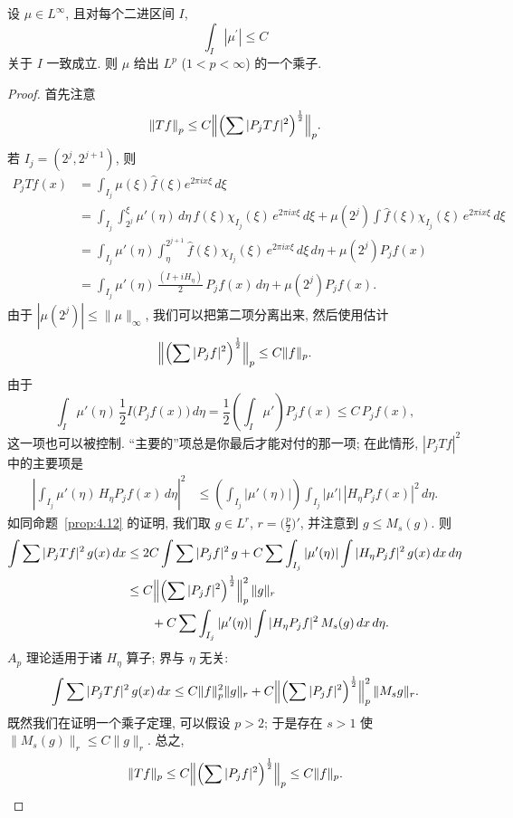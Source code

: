 \begin{theorem}\label{thm:4.14}
设 $\mu\in L^{\infty}$, 且对每个二进区间 $I$,
\[
\int_{I}|\mu^{\prime}|\leq C
\]
关于 $I$ 一致成立. 则 $\mu$ 给出 $L^{p}$ ($1<p<\infty$) 的一个乘子.
\end{theorem}

\begin{proof}
首先注意
\[
\left\|T f\right\|_{p}\leq C\Bigl\|\Bigl(\sum|P_{j}T f|^{2}\Bigr)^{\frac{1}{2}}\Bigr\|_{p}.
\]
若 $I_{j}=(2^{j},2^{j+1})$, 则
\begin{align*}
P_{j}Tf(x)&=\int_{I_{j}}\mu(\xi)\hat{f}(\xi)e^{2\pi ix\xi}\,d\xi \\
&=\int_{I_{j}}\int_{2^{j}}^{\xi}\mu'(\eta)\,d\eta\,\hat{f}(\xi)\chi_{I_{j}}(\xi)\,e^{2\pi ix\xi}\,d\xi
+\mu(2^{j})\int\hat{f}(\xi)\chi_{I_{j}}(\xi)\,e^{2\pi ix\xi}\,d\xi \\
&=\int_{I_{j}}\mu'(\eta)\int_{\eta}^{2^{j+1}}\hat{f}(\xi)\chi_{I_{j}}(\xi)\,e^{2\pi ix\xi}\,d\xi\,d\eta
+\mu(2^{j})P_{j}f(x) \\
&=\int_{I_{j}}\mu'(\eta)\,\frac{(I+iH_{\eta})}{2}\,P_{j}f(x)\,d\eta+\mu(2^{j})P_{j}f(x).
\end{align*}
由于 $|\mu(2^j)|\leq\|\mu\|_\infty$, 我们可以把第二项分离出来, 然后使用估计
\[
\Bigl\|\Bigl(\sum|P_{j}f|^{2}\Bigr)^{\frac{1}{2}}\Bigr\|_{p}\leq C\|f\|_{p}.
\]
由于
\[
\int_{I}\mu'(\eta)\,\frac{1}{2}I\bigl(P_{j}f(x)\bigr)\,d\eta
=\frac{1}{2}\left(\int_{I}\mu'\right)P_{j}f(x)\leq C\,P_{j}f(x),
\]
这一项也可以被控制. ``主要的''项总是你最后才能对付的那一项; 在此情形, $|P_jTf|^2$ 中的主要项是
\begin{align*}
\left|\int_{I_{j}}\mu'(\eta)\,H_\eta P_{j}f(x)\,d\eta\right|^{2}
&\leq\left(\int_{I_{j}}|\mu'(\eta)|\right)\int_{I_{j}}|\mu'|\,|H_\eta P_{j}f(x)|^{2}\,d\eta.
\end{align*}
如同命题~\ref{prop:4.12} 的证明, 我们取 $g\in L^r$, $r=\bigl(\frac{p}{2}\bigr)'$, 并注意到 $g\leq M_s(g)$. 则
\begin{align*}
\int\sum|P_{j}T f|^{2}\,g(x)\,dx
&\leq 2C\int\sum|P_{j}f|^{2}\,g
+C\sum\int_{I_{j}}|\mu'(\eta)|\int|H_\eta P_{j}f|^{2}\,g(x)\,dx\,d\eta \\
&\leq C\Bigl\|\Bigl(\sum|P_{j}f|^{2}\Bigr)^{\frac{1}{2}}\Bigr\|_{p}^{2}\,\|g\|_{r} \\
&\qquad+C\sum\int_{I_{j}}|\mu'(\eta)|\int|H_\eta P_{j}f|^{2}\,M_{s}(g)\,dx\,d\eta.
\end{align*}
$A_{p}$ 理论适用于诸 $H_{\eta}$ 算子; 界与 $\eta$ 无关:
\[
\int\sum|P_{j}T f|^{2}\,g(x)\,dx
\leq C\|f\|_{p}^{2}\|g\|_{r}+C\Bigl\|\Bigl(\sum|P_{j}f|^{2}\Bigr)^{\frac{1}{2}}\Bigr\|_{p}^{2}\,\|M_{s}g\|_{r}.
\]
既然我们在证明一个乘子定理, 可以假设 $p>2$; 于是存在 $s>1$ 使 $\|M_s(g)\|_r\leq C\|g\|_r$. 总之,
\[
\|T f\|_{p}\leq C\Bigl\|\Bigl(\sum|P_{j}f|^{2}\Bigr)^{\frac{1}{2}}\Bigr\|_{p}\leq C\|f\|_{p}. \qedhere
\]
\end{proof}

